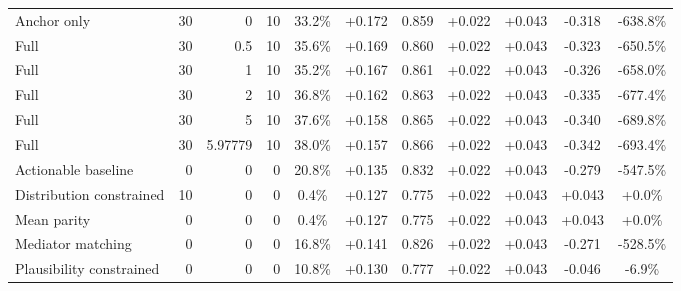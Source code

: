 \begin{table}[htbp]
\begin{tabular}{lrrrccccccc}
Anchor only & 30 & 0 & 10 & 33.2\% & +0.172 & 0.859 & +0.022 & +0.043 & -0.318 & -638.8\% \\
Full & 30 & 0.5 & 10 & 35.6\% & +0.169 & 0.860 & +0.022 & +0.043 & -0.323 & -650.5\% \\
Full & 30 & 1 & 10 & 35.2\% & +0.167 & 0.861 & +0.022 & +0.043 & -0.326 & -658.0\% \\
Full & 30 & 2 & 10 & 36.8\% & +0.162 & 0.863 & +0.022 & +0.043 & -0.335 & -677.4\% \\
Full & 30 & 5 & 10 & 37.6\% & +0.158 & 0.865 & +0.022 & +0.043 & -0.340 & -689.8\% \\
Full & 30 & 5.97779 & 10 & 38.0\% & +0.157 & 0.866 & +0.022 & +0.043 & -0.342 & -693.4\% \\
Actionable baseline & 0 & 0 & 0 & 20.8\% & +0.135 & 0.832 & +0.022 & +0.043 & -0.279 & -547.5\% \\
Distribution constrained & 10 & 0 & 0 & 0.4\% & +0.127 & 0.775 & +0.022 & +0.043 & +0.043 & +0.0\% \\
Mean parity & 0 & 0 & 0 & 0.4\% & +0.127 & 0.775 & +0.022 & +0.043 & +0.043 & +0.0\% \\
Mediator matching & 0 & 0 & 0 & 16.8\% & +0.141 & 0.826 & +0.022 & +0.043 & -0.271 & -528.5\% \\
Plausibility constrained & 0 & 0 & 0 & 10.8\% & +0.130 & 0.777 & +0.022 & +0.043 & -0.046 & -6.9\% \\
\bottomrule
\end{tabular}
\end{table}